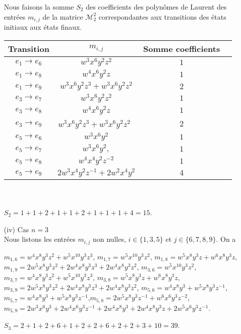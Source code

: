 \begin{itemize}
 Nous faisons la  somme $S_{2}$ des coefficients des polynômes de Laurent des entrées $m_{i,j}$ de la matrice $\mathcal{M}_{2}^{2}$  correspondantes aux transitions des états initiaux aux états finaux.\\\mbox{}
 
 
 \begin{tabular}{|c|c|c|c|}
 \hline
  Transition & $m_{i,j}$&Somme  coefficients\\
 \hline
  $e_{1}\rightarrow e_{6}$ & $w^3x^6y^2z^{2}$ &$1$ \\ 
 \hline
 $e_{1}\rightarrow e_{8}$ & $w^4x^6y^2z$  & $1$ \\
 \hline
 $e_{1}\rightarrow e_{9}$ & $w^3x^6y^2z^{3}+w^3x^6y^2z^{2}$ & $2$ \\
 \hline
 $e_{3}\rightarrow e_{7}$ & $w^3x^6y^2z^{2}$ & $1$ \\
 \hline
 $e_{3}\rightarrow e_{8}$ & $ w^4x^6y^2z$ & $1$ \\
 \hline
 $e_{3}\rightarrow e_{9}$ & $w^3x^6y^2z^{3}+w^3x^6y^2z^{2} $\ & $2$ \\
 \hline
  $e_{5}\rightarrow e_{6}$&$ w^3x^6y^2 $& $1$\\
 \hline
  $e_{5}\rightarrow e_{7}$&$ w^3x^6y^2, $& $1$\\
 \hline
  $e_{5}\rightarrow e_{8}$&$ w^4x^4y^2z^{-2}  $& $1$\\
 \hline
  $e_{5}\rightarrow e_{9}$&$2w^3x^4y^2z^{-1}+2w^2x^4y^2$& $4$\\
 \hline
\end{tabular}
\mbox{ }\\\\
$S_{2}=1+1+2+1+1+2+1+1+1+4=15$.

\item[(iv)] Cas $n=3$\\
 Nous listons les entrées $m_{i,j}$ non nulles, $i\in\{1,3,5\}$ et $j\in\{6,7,8,9\}$. 
 On a 
 
$m_{1,6}=w^4x^8y^3z^2+w^5x^{10}y^3z^3$,  $m_{1,7}=w^5x^{10}y^3z^2 $,  $m_{1,8}=w^5x^8y^3z+w^6x^8y^3z$,  $m_{1,9}=2w^5x^8y^3z^2+2w^4x^8y^3z^3+2w^4x^8y^3z^2$,
$m_{3,6}=w^5x^{10}y^3z^2$, $m_{3,7}=w^4x^8y^3z^2+w^5x^{10}y^3z^3 $,  $m_{3,8}=w^5x^8y^3z+w^6x^8y^3z$,  $m_{3,9}=2w^5x^8y^3z^2+2w^4x^8y^3z^3+2w^4x^8y^3z^2$, 
$m_{5,6}=w^4x^8y^3+w^5x^8y^3z^{-1}$, $m_{5,7}=w^4x^8y^3+w^5x^8y^3z^{-1}$,$m_{5,8}=2w^5x^8y^3z^{-1}+w^6x^6y^3z^{-2}$, $m_{5,9}=2w^3x^6y^3+2w^4x^6y^3z^{-1}+2w^4x^8y^3+2w^4x^8y^3z+2w^5x^6y^3z^{-1}$.

$S_{3}=2+1+2+6+1+2+2+6+2+2+3+10=39$.


\end{itemize}
